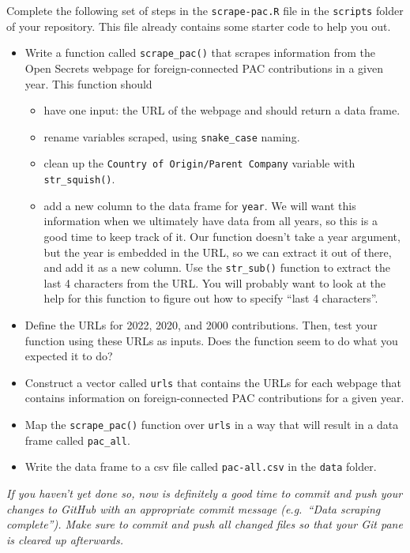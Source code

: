 \documentclass[
]{article}
\providecommand{\tightlist}{%
  \setlength{\itemsep}{0pt}\setlength{\parskip}{0pt}}
\begin{document}
Complete the following set of steps in the \texttt{scrape-pac.R} file in
the \texttt{scripts} folder of your repository. This file already
contains some starter code to help you out.

\begin{itemize}
\item
  Write a function called \texttt{scrape\_pac()} that scrapes
  information from the Open Secrets webpage for foreign-connected PAC
  contributions in a given year. This function should

  \begin{itemize}
  \tightlist
  \item
    have one input: the URL of the webpage and should return a data
    frame.
  \item
    rename variables scraped, using \texttt{snake\_case} naming.
  \item
    clean up the \texttt{Country\ of\ Origin/Parent\ Company} variable
    with \texttt{str\_squish()}.
  \item
    add a new column to the data frame for \texttt{year}. We will want
    this information when we ultimately have data from all years, so
    this is a good time to keep track of it. Our function doesn't take a
    year argument, but the year is embedded in the URL, so we can
    extract it out of there, and add it as a new column. Use the
    \texttt{str\_sub()} function to extract the last 4 characters from
    the URL. You will probably want to look at the help for this
    function to figure out how to specify ``last 4 characters''.
  \end{itemize}
\item
  Define the URLs for 2022, 2020, and 2000 contributions. Then, test
  your function using these URLs as inputs. Does the function seem to do
  what you expected it to do?
\item
  Construct a vector called \texttt{urls} that contains the URLs for
  each webpage that contains information on foreign-connected PAC
  contributions for a given year.
\item
  Map the \texttt{scrape\_pac()} function over \texttt{urls} in a way
  that will result in a data frame called \texttt{pac\_all}.
\item
  Write the data frame to a csv file called \texttt{pac-all.csv} in the
  \texttt{data} folder.
\end{itemize}

\emph{If you haven't yet done so, now is definitely a good time to
commit and push your changes to GitHub with an appropriate commit
message (e.g.~``Data scraping complete''). Make sure to commit and push
all changed files so that your Git pane is cleared up afterwards.}
\end{document}
